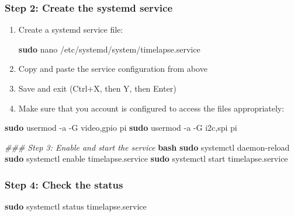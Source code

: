 \documentclass[
]{article}
\newenvironment{Shaded}{\begin{snugshade}}{\end{snugshade}}
\newcommand{\AttributeTok}[1]{\textcolor[rgb]{0.13,0.29,0.53}{#1}}
\newcommand{\CommentTok}[1]{\textcolor[rgb]{0.56,0.35,0.01}{\textit{#1}}}
\newcommand{\FunctionTok}[1]{\textcolor[rgb]{0.13,0.29,0.53}{\textbf{#1}}}
\newcommand{\KeywordTok}[1]{\textcolor[rgb]{0.13,0.29,0.53}{\textbf{#1}}}
\newcommand{\NormalTok}[1]{#1}
\begin{document}
\subsubsection{Step 2: Create the systemd
service}\label{step-2-create-the-systemd-service}

\begin{enumerate}
\def\labelenumi{\arabic{enumi}.}
\item
  Create a systemd service file:

\begin{Shaded}
\begin{Highlighting}[]
\FunctionTok{sudo}\NormalTok{ nano /etc/systemd/system/timelapse.service}
\end{Highlighting}
\end{Shaded}
\item
  Copy and paste the service configuration from above
\item
  Save and exit (Ctrl+X, then Y, then Enter)
\item
  Make sure that you account is configured to access the files
  appropriately:
\end{enumerate}

\begin{Shaded}
\begin{Highlighting}[]
\FunctionTok{sudo}\NormalTok{ usermod }\AttributeTok{{-}a} \AttributeTok{{-}G}\NormalTok{ video,gpio pi}
\FunctionTok{sudo}\NormalTok{ usermod }\AttributeTok{{-}a} \AttributeTok{{-}G}\NormalTok{ i2c,spi pi}

\CommentTok{\#\#\# Step 3: Enable and start the service}
\KeywordTok{\textasciigrave{}\textasciigrave{}\textasciigrave{}}\FunctionTok{bash}
\FunctionTok{sudo}\NormalTok{ systemctl daemon{-}reload}
\FunctionTok{sudo}\NormalTok{ systemctl enable timelapse.service}
\FunctionTok{sudo}\NormalTok{ systemctl start timelapse.service}
\end{Highlighting}
\end{Shaded}

\subsubsection{Step 4: Check the status}\label{step-4-check-the-status}

\begin{Shaded}
\begin{Highlighting}[]
\FunctionTok{sudo}\NormalTok{ systemctl status timelapse.service}
\end{Highlighting}
\end{Shaded}
\end{document}
